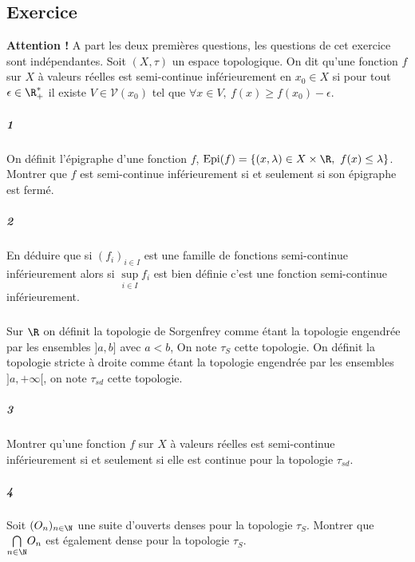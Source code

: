 \documentclass[10pt,a4paper]{article} 
\begin{document}
\subsection{Exercice}
\textbf{Attention !} A part les deux premières questions, les questions de cet exercice sont indépendantes.
Soit $(X,\tau)$ un espace topologique. On dit qu'une fonction $f$ sur $X$ à valeurs réelles est semi-continue inférieurement en $x_0 \in X$ si pour tout $\epsilon \in \R_+^*$ il existe $V \in \mathcal{V}(x_0)$ tel que $\forall x \in V, \ f(x) \ge f(x_0) - \epsilon$.
\subparagraph{1} On définit l'épigraphe d'une fonction $f$, $\operatorname{Epi}(f) = \lbrace (x,\lambda) \in X \times \R, \ f(x) \le \lambda \rbrace$. Montrer que $f$ est semi-continue inférieurement si et seulement si son épigraphe est fermé.
\subparagraph{2} En déduire que si $(f_i)_{i \in I}$ est une famille de fonctions semi-continue inférieurement alors si $\underset{i \in I}{\sup}f_i$ est bien définie c'est une fonction semi-continue inférieurement.
\subparagraph{}Sur $\R$ on définit la topologie de Sorgenfrey comme étant la topologie engendrée par les ensembles $]a,b]$ avec $a<b$, On note $\tau_S$ cette topologie. On définit la topologie stricte à droite comme étant la topologie engendrée par les ensembles $]a,+\infty[$, on note $\tau_{sd}$ cette topologie.
\subparagraph{3} Montrer qu'une fonction $f$ sur $X$ à valeurs réelles est semi-continue inférieurement si et seulement si elle est continue pour la topologie $\tau_{sd}$.
\subparagraph{4} Soit $(O_n)_{n \in \N}$ une suite d'ouverts denses pour la topologie $\tau_S$. Montrer que $\underset{n \in \N}{\bigcap} O_n$ est également dense pour la topologie $\tau_S$.
\end{document}
